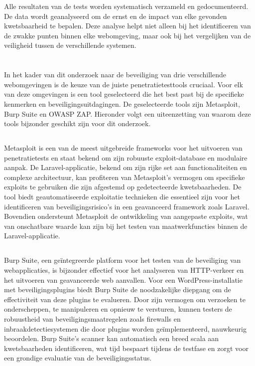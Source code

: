 Alle resultaten van de tests worden systematisch verzameld en gedocumenteerd. De data wordt geanalyseerd 
om de ernst en de impact van elke gevonden kwetsbaarheid te bepalen. Deze analyse helpt niet alleen bij 
het identificeren van de zwakke punten binnen elke webomgeving, maar ook bij het vergelijken van de 
veiligheid tussen de verschillende systemen.

\section{}
In het kader van dit onderzoek naar de beveiliging van drie verschillende webomgevingen is de keuze van 
de juiste penetratietesttools cruciaal. Voor elk van deze omgevingen is een tool geselecteerd die het 
best past bij de specifieke kenmerken en beveiligingsuitdagingen. De geselecteerde tools zijn 
Metasploit, Burp Suite en OWASP ZAP. Hieronder volgt een uiteenzetting van waarom deze tools 
bijzonder geschikt zijn voor dit onderzoek.

\subsection{}
Metasploit is een van de meest uitgebreide frameworks voor het uitvoeren van penetratietests en 
staat bekend om zijn robuuste exploit-database en modulaire aanpak. De Laravel-applicatie, bekend 
om zijn rijke set aan functionaliteiten en complexe architectuur, kan profiteren van Metasploit's 
vermogen om specifieke exploits te gebruiken die zijn afgestemd op gedetecteerde kwetsbaarheden. 
De tool biedt geautomatiseerde exploitatie technieken die essentieel zijn voor het identificeren 
van beveiligingsrisico’s in een geavanceerd framework zoals Laravel. Bovendien ondersteunt 
Metasploit de ontwikkeling van aangepaste exploits, wat van onschatbare waarde kan zijn bij 
het testen van maatwerkfuncties binnen de Laravel-applicatie.

\subsection{}
Burp Suite, een geïntegreerde platform voor het testen van de beveiliging van webapplicaties, is 
bijzonder effectief voor het analyseren van HTTP-verkeer en het uitvoeren van geavanceerde web 
aanvallen. Voor een WordPress-installatie met beveiligingsplugins biedt Burp Suite de noodzakelijke 
diepgang om de effectiviteit van deze plugins te evalueren. Door zijn vermogen om verzoeken te 
onderscheppen, te manipuleren en opnieuw te versturen, kunnen testers de robuustheid van 
beveiligingsmaatregelen zoals firewalls en inbraakdetectiesystemen die door plugins worden 
geïmplementeerd, nauwkeurig beoordelen. Burp Suite's scanner kan automatisch een breed scala 
aan kwetsbaarheden identificeren, wat tijd bespaart tijdens de testfase en zorgt voor een 
grondige evaluatie van de beveiligingsstatus.

